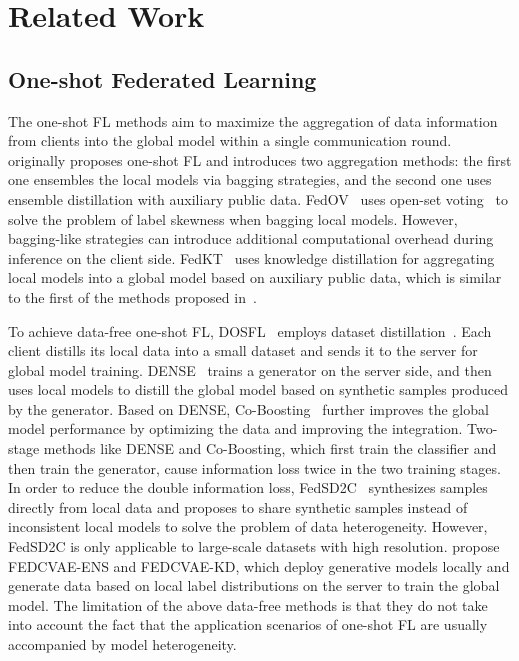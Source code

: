 \section{Related Work}


\subsection{One-shot Federated Learning}

The one-shot FL methods aim to maximize the aggregation of data information from clients into the global model within a single communication round.~\cite{guha2019one} originally proposes one-shot FL and introduces two aggregation methods: the first one ensembles the local models via bagging strategies, and the second one uses ensemble distillation with auxiliary public data. FedOV~\cite{heinbaugh2023datafree} uses open-set voting~\cite{neal2018open,zhou2021learning} to solve the problem of label skewness when bagging local models. However, bagging-like strategies can introduce additional computational overhead during inference on the client side. FedKT~\cite{Li2020PracticalOF} uses knowledge distillation for aggregating local models into a global model based on auxiliary public data, which is similar to the first of the methods proposed in~\cite{guha2019one}. 

To achieve data-free one-shot FL, DOSFL~\cite{zhou2020distilled} employs dataset distillation~\cite{wang2018dataset}. Each client distills its local data into a small dataset and sends it to the server for global model training. DENSE~\cite{zhang2022dense} trains a generator on the server side, and then uses local models to distill the global model based on synthetic samples produced by the generator. Based on DENSE, Co-Boosting~\cite{dai2024enhancing} further improves the global model performance by optimizing the data and improving the integration. Two-stage methods like DENSE and Co-Boosting, which first train the classifier and then train the generator, cause information loss twice in the two training stages. In order to reduce the double information loss, FedSD2C~\cite{zhang2024one} synthesizes samples directly from local data and proposes to share synthetic samples instead of inconsistent local models to solve the problem of data heterogeneity. However, FedSD2C is only applicable to large-scale datasets with high resolution. \cite{heinbaugh2023datafree} propose FEDCVAE-ENS and FEDCVAE-KD, which deploy generative models locally and generate data based on local label distributions on the server to train the global model. The limitation of the above data-free methods is that they do not take into account the fact that the application scenarios of one-shot FL are usually accompanied by model heterogeneity.



